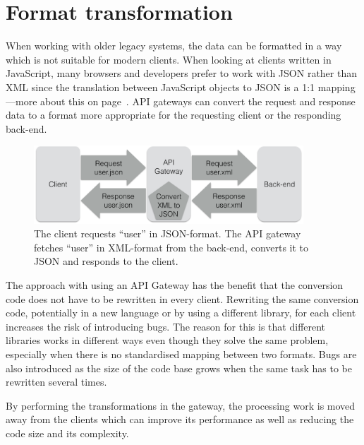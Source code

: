 \documentclass{cslthse-msc}
\begin{document}
\section{Format transformation}
When working with older legacy systems, the data can be formatted in a way which is not suitable for modern clients. When looking at clients written in JavaScript, many browsers and developers prefer to work with JSON rather than XML since the translation between JavaScript objects to JSON is a 1:1 mapping---more about this on page~\pageref{xml_json}. API gateways can convert the request and response data to a format more appropriate for the requesting client or the responding back-end.

\begin{figure}[H]
  \centering
    \begin{center}
      \includegraphics[width=0.9\textwidth]{images/api_gateway_transform.png}
    \end{center}
  \caption{The client requests \enquote{user} in JSON-format. The API gateway fetches \enquote{user} in XML-format from the back-end, converts it to JSON and responds to the client.}
\end{figure}

The approach with using an API Gateway has the benefit that the conversion code does not have to be rewritten in every client. Rewriting the same conversion code, potentially in a new language or by using a different library, for each client increases the risk of introducing bugs. The reason for this is that different libraries works in different ways even though they solve the same problem, especially when there is no standardised mapping between two formats. Bugs are also introduced as the size of the code base grows when the same task has to be rewritten several times\cite[page 521]{code_complete}. 

By performing the transformations in the gateway, the processing work is moved away from the clients which can improve its performance as well as reducing the code size and its complexity.
\end{document}
